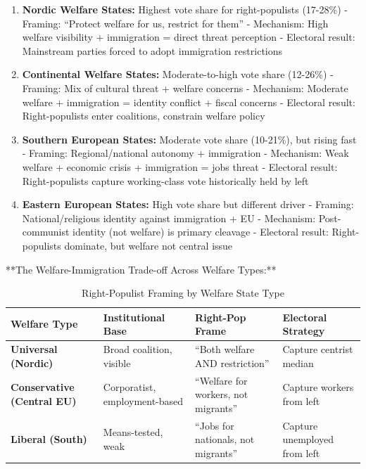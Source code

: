 \begin{enumerate}

\item \textbf{Nordic Welfare States:} Highest vote share for right-populists (17-28\%)
   - Framing: ``Protect welfare for us, restrict for them''
   - Mechanism: High welfare visibility + immigration = direct threat perception
   - Electoral result: Mainstream parties forced to adopt immigration restrictions

\item \textbf{Continental Welfare States:} Moderate-to-high vote share (12-26\%)
   - Framing: Mix of cultural threat + welfare concerns
   - Mechanism: Moderate welfare + immigration = identity conflict + fiscal concerns
   - Electoral result: Right-populists enter coalitions, constrain welfare policy

\item \textbf{Southern European States:} Moderate vote share (10-21\%), but rising fast
   - Framing: Regional/national autonomy + immigration
   - Mechanism: Weak welfare + economic crisis + immigration = jobs threat
   - Electoral result: Right-populists capture working-class vote historically held by left

\item \textbf{Eastern European States:} High vote share but different driver
   - Framing: National/religious identity against immigration + EU
   - Mechanism: Post-communist identity (not welfare) is primary cleavage
   - Electoral result: Right-populists dominate, but welfare not central issue

\end{enumerate}

**The Welfare-Immigration Trade-off Across Welfare Types:**

\begin{table}[h]
\centering
\caption{Right-Populist Framing by Welfare State Type}
\label{tab:welfare-framing}
\begin{tabular}{llll}
\toprule
\textbf{Welfare Type} & \textbf{Institutional Base} & \textbf{Right-Pop Frame} & \textbf{Electoral Strategy} \\
\midrule
\textbf{Universal (Nordic)} & Broad coalition, visible & ``Both welfare AND restriction'' & Capture centrist median \\
\textbf{Conservative (Central EU)} & Corporatist, employment-based & ``Welfare for workers, not migrants'' & Capture workers from left \\
\textbf{Liberal (South)} & Means-tested, weak & ``Jobs for nationals, not migrants'' & Capture unemployed from left \\
\bottomrule
\end{tabular}
\end{table}

